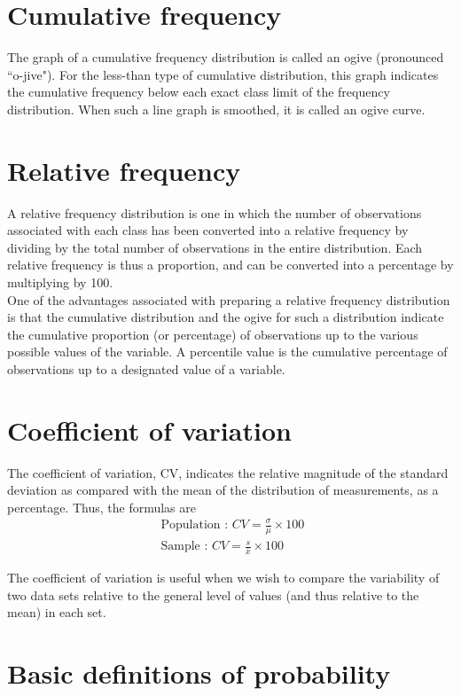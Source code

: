 \documentclass[12pt]{article}
\begin{document}
\section{Cumulative frequency}
The graph of a cumulative frequency distribution is called an ogive (pronounced ``o-jive"). For the less-than
type of cumulative distribution, this graph indicates the cumulative frequency below each exact class limit of
the frequency distribution. When such a line graph is smoothed, it is called an ogive curve.


\section{Relative frequency}
A relative frequency distribution is one in which the number of observations associated with each class has
been converted into a relative frequency by dividing by the total number of observations in the entire
distribution. Each relative frequency is thus a proportion, and can be converted into a percentage by multiplying
by 100.\\

\noindent One of the advantages associated with preparing a relative frequency distribution is that the cumulative
distribution and the ogive for such a distribution indicate the cumulative proportion (or percentage) of
observations up to the various possible values of the variable. A percentile value is the cumulative percentage of
observations up to a designated value of a variable.

\section{Coefficient of variation}
The coefficient of variation, CV, indicates the relative magnitude of the standard deviation as compared
with the mean of the distribution of measurements, as a percentage. Thus, the formulas are
\begin{eqnarray*}
\mbox{ Population : } CV = \frac{\sigma}{\mu } \times 100 \\
\mbox{ Sample : } CV = \frac{s}{\bar{x}} \times 100
\end{eqnarray*}

The coefficient of variation is useful when we wish to compare the variability of two data sets relative to the
general level of values (and thus relative to the mean) in each set.

\section{Basic definitions of probability}
\end{document}
